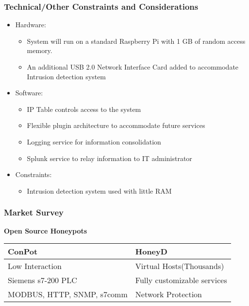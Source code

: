 \begin{frame}
\frametitle{Technical/Other Constraints and Considerations}

\begin{itemize}
\item Hardware:
\begin{itemize}
\item System will run on a standard Raspberry Pi with 1 GB of random access memory.  
\item An additional USB 2.0 Network Interface Card added to accommodate Intrusion detection system
\end{itemize}

\item Software:
\begin{itemize}
\item IP Table controls access to the system
\item Flexible plugin architecture to accommodate future services
\item Logging service for information consolidation
\item Splunk service to relay information to IT administrator
\end{itemize}

\item Constraints:
\begin{itemize}
\item Intrusion detection system used with little RAM
\end{itemize}


\end{itemize}

\end{frame}

\begin{frame}
\frametitle{Market Survey}

\begin{center}
\textbf{Open Source Honeypots}
\end{center}

\begin{tabular}{l | l}
\toprule
\textbf{ConPot} & \textbf{HoneyD} \\
\midrule
Low Interaction & Virtual Hosts(Thousands) \\
Siemens s7-200 PLC & Fully customizable services \\
MODBUS, HTTP, SNMP, s7comm & Network Protection \\
\bottomrule
\end{tabular}


\end{frame}

